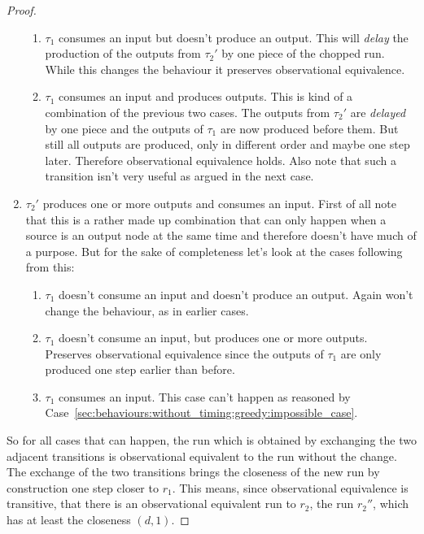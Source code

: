 \begin{proof}
\begin{enumerate}
\begin{enumerate}
        \item \(\tau_1\) consumes an input but doesn't produce an output. This will \emph{delay} the production of the outputs from \(\tau_2'\) by one piece of the chopped run. While this changes the behaviour it preserves observational equivalence.
        \item \(\tau_1\) consumes an input and produces outputs. This is kind of a combination of the previous two cases. The outputs from \(\tau_2'\) are \emph{delayed} by one piece and the outputs of \(\tau_1\) are now produced before them. But still all outputs are produced, only in different order and maybe one step later. Therefore observational equivalence holds. Also note that such a transition isn't very useful as argued in the next case.
      \end{enumerate}
    \item \(\tau_2'\) produces one or more outputs and consumes an input. First of all note that this is a rather made up combination that can only happen when a source is an output node at the same time and therefore doesn't have much of a purpose. But for the sake of completeness let's look at the cases following from this:
      \begin{enumerate}
        \item \(\tau_1\) doesn't consume an input and doesn't produce an output. Again won't change the behaviour, as in earlier cases.
        \item\label{sec:behaviours:without_timing:greedy:non_greedy_2} \(\tau_1\) doesn't consume an input, but produces one or more outputs. Preserves observational equivalence since the outputs of \(\tau_1\) are only produced one step earlier than before.
        \item \(\tau_1\) consumes an input. This case can't happen as reasoned by Case~\ref{sec:behaviours:without_timing:greedy:impossible_case}.
      \end{enumerate}
  \end{enumerate}

  So for all cases that can happen, the run which is obtained by exchanging the two adjacent transitions is observational equivalent to the run without the change.
  The exchange of the two transitions brings the closeness of the new run by construction one step closer to \(r_1\).
  This means, since observational equivalence is transitive, that there is an observational equivalent run to \(r_2\), the run \(r_2''\),  which has at least the closeness \((d, 1)\).


\end{proof}
